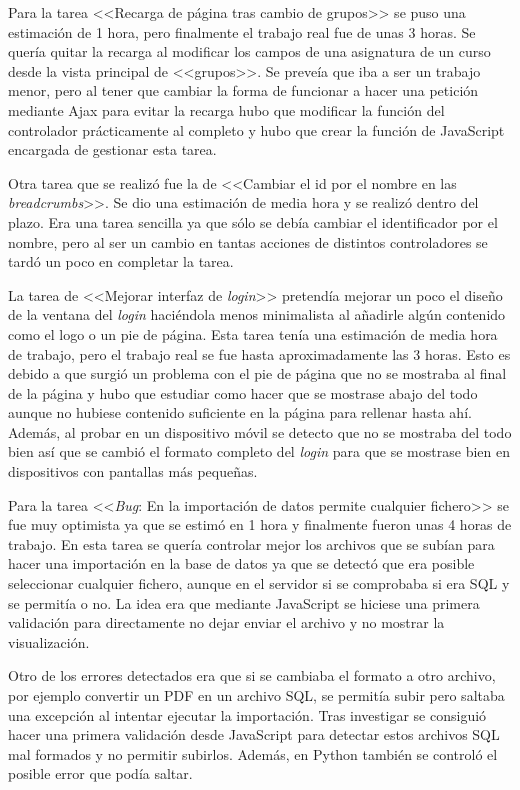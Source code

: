 \begin{itemize}
Para la tarea <<Recarga de página tras cambio de grupos>> se puso una estimación de 1 hora, pero finalmente el trabajo real fue de unas 3 horas.
Se quería quitar la recarga al modificar los campos de una asignatura de un curso desde la vista principal de <<grupos>>.
Se preveía que iba a ser un trabajo menor, pero al tener que cambiar la forma de funcionar a hacer una petición mediante Ajax para evitar la recarga hubo que modificar la función del controlador prácticamente al completo y hubo que crear la función de JavaScript encargada de gestionar esta tarea.

Otra tarea que se realizó fue la de <<Cambiar el id por el nombre en las \textit{breadcrumbs}>>.
Se dio una estimación de media hora y se realizó dentro del plazo.
Era una tarea sencilla ya que sólo se debía cambiar el identificador por el nombre, pero al ser un cambio en tantas acciones de distintos controladores se tardó un poco en completar la tarea.

La tarea de <<Mejorar interfaz de \textit{login}>> pretendía mejorar un poco el diseño de la ventana del \textit{login} haciéndola menos minimalista al añadirle algún contenido como el logo o un pie de página.
Esta tarea tenía una estimación de media hora de trabajo, pero el trabajo real se fue hasta aproximadamente las 3 horas.
Esto es debido a que surgió un problema con el pie de página que no se mostraba al final de la página y hubo que estudiar como hacer que se mostrase abajo del todo aunque no hubiese contenido suficiente en la página para rellenar hasta ahí. 
Además, al probar en un dispositivo móvil se detecto que no se mostraba del todo bien así que se cambió el formato completo del \textit{login} para que se mostrase bien en dispositivos con pantallas más pequeñas.

Para la tarea <<\textit{Bug}: En la importación de datos permite cualquier fichero>> se fue muy optimista ya que se estimó en 1 hora y finalmente fueron unas 4 horas de trabajo.
En esta tarea se quería controlar mejor los archivos que se subían para hacer una importación en la base de datos ya que se detectó que era posible seleccionar cualquier fichero, aunque en el servidor si se comprobaba si era SQL y se permitía o no.
La idea era que mediante JavaScript se hiciese una primera validación para directamente no dejar enviar el archivo y no mostrar la visualización.

Otro de los errores detectados era que si se cambiaba el formato a otro archivo, por ejemplo convertir un PDF en un archivo SQL, se permitía subir pero saltaba una excepción al intentar ejecutar la importación.
Tras investigar se consiguió hacer una primera validación desde JavaScript para detectar estos archivos SQL mal formados y no permitir subirlos.
Además, en Python también se controló el posible error que podía saltar.


\end{itemize}
